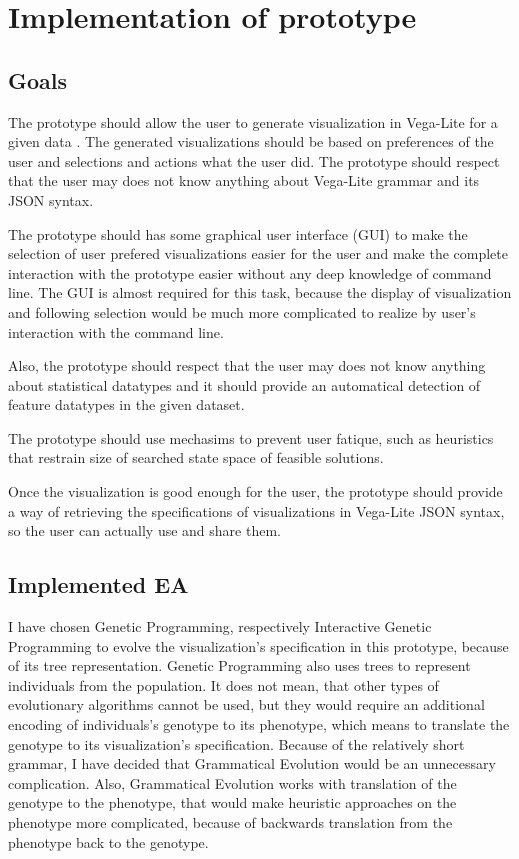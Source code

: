 \chapter{Implementation of prototype}
\section{Goals}
  The prototype should allow the user to generate visualization in Vega-Lite for a given data . The generated visualizations should be based on preferences of the user and selections and actions what the user did. The prototype should respect that the user may does not know anything about Vega-Lite grammar and its JSON syntax.

  The prototype should has some graphical user interface (GUI) to make the selection of user prefered visualizations easier for the user and make the complete interaction with the prototype easier without any deep knowledge of command line. The GUI is almost required for this task, because the display of visualization and following selection would be much more complicated to realize by user's interaction with the command line.

  Also, the prototype should respect that the user may does not know anything about statistical datatypes and it should provide an automatical detection of feature datatypes in the given dataset.

  The prototype should use mechasims to prevent user fatique, such as heuristics that restrain size of searched state space of feasible solutions.

  Once the visualization is good enough for the user, the prototype should provide a way of retrieving the specifications of visualizations in Vega-Lite JSON syntax, so the user can actually use and share them.


\section{Implemented EA}
I have chosen Genetic Programming, respectively Interactive Genetic Programming to evolve the visualization's specification in this prototype, because of its tree representation. Genetic Programming also uses trees to represent individuals from the population. It does not mean, that other types of evolutionary algorithms cannot be used, but they would require an additional encoding of individuals's genotype to its phenotype, which means to translate the genotype to its visualization's specification. Because of the relatively short grammar, I have decided that Grammatical Evolution would be an unnecessary complication. Also, Grammatical Evolution works with translation of the genotype to the phenotype, that would make heuristic approaches on the phenotype more complicated, because of backwards translation from the phenotype back to the genotype.
